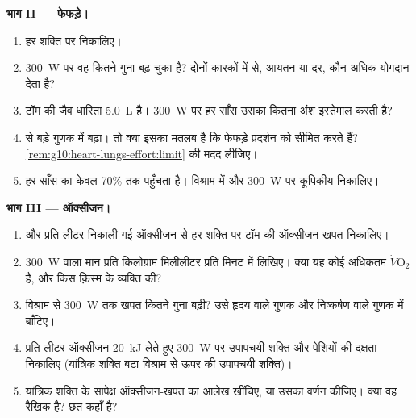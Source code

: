 \begin{problem}
\medskip
\noindent\textbf{भाग II --- फेफड़े।}
\begin{enumerate}[resume]
  \item हर शक्ति पर  निकालिए।
  \item \qty{300}{W} पर वह कितने गुना बढ़ चुका है? दोनों कारकों में से,
        आयतन या दर, कौन अधिक योगदान देता है?
  \item टॉम की जैव धारिता \qty{5.0}{L} है। \qty{300}{W} पर हर साँस उसका
        कितना अंश इस्तेमाल करती है?
  \item {}  से बड़े गुणक में बढ़ा। तो क्या इसका मतलब है
        कि फेफड़े प्रदर्शन को सीमित करते हैं?
        \cref{rem:g10:heart-lungs-effort:limit} की मदद लीजिए।
  \item हर साँस का केवल 70\%  तक पहुँचता है। विश्राम में और
        \qty{300}{W} पर कूपिकीय  निकालिए।
\end{enumerate}

\medskip
\noindent\textbf{भाग III --- ऑक्सीजन।}
\begin{enumerate}[resume]
  \item {} और प्रति लीटर निकाली गई ऑक्सीजन से हर शक्ति पर टॉम
        की ऑक्सीजन-खपत निकालिए।
  \item \qty{300}{W} वाला मान प्रति किलोग्राम मिलीलीटर प्रति मिनट में
        लिखिए। क्या यह कोई अधिकतम $\dot V\!\mathrm{O_2}$ है, और किस
        क़िस्म के व्यक्ति की?
  \item विश्राम से \qty{300}{W} तक खपत कितने गुना बढ़ी? उसे हृदय वाले
        गुणक और निष्कर्षण वाले गुणक में बाँटिए।
  \item प्रति लीटर ऑक्सीजन \qty{20}{kJ} लेते हुए \qty{300}{W} पर
        उपापचयी शक्ति और पेशियों की दक्षता निकालिए (यांत्रिक शक्ति बटा
        विश्राम से ऊपर की उपापचयी शक्ति)।
  \item यांत्रिक शक्ति के सापेक्ष ऑक्सीजन-खपत का आलेख खींचिए, या उसका
        वर्णन कीजिए। क्या वह रैखिक है? छत कहाँ है?
\end{enumerate}


\end{problem}
